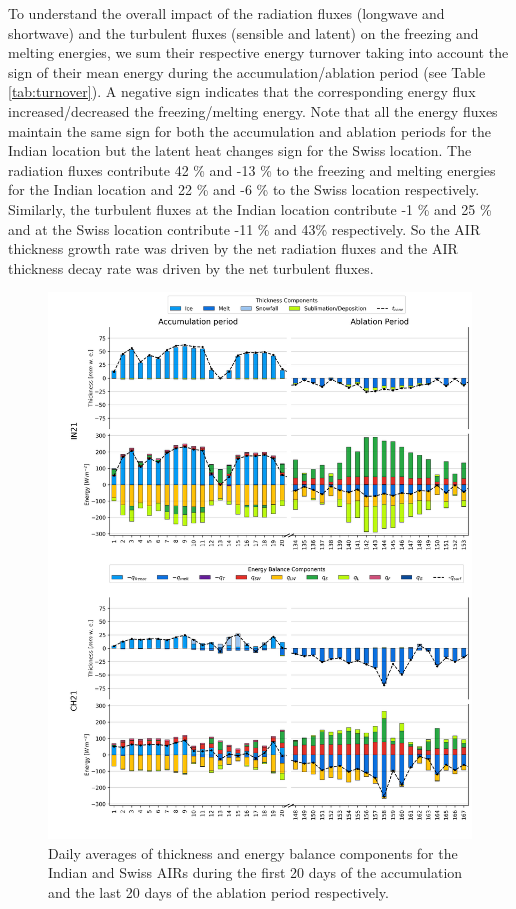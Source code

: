 \documentclass[utf8]{frontiersSCNS}
\begin{document}
To understand the overall impact of the radiation fluxes (longwave and shortwave) and the turbulent fluxes
(sensible and latent) on the freezing and melting energies, we sum their respective energy turnover taking into
account the sign of their mean energy during the accumulation/ablation period (see Table \ref{tab:turnover}). A negative sign indicates that
the corresponding energy flux increased/decreased the freezing/melting energy. Note that all the energy fluxes
maintain the same sign for both the accumulation and ablation periods for the Indian location but the latent
heat changes sign for the Swiss location. The radiation fluxes contribute 42 \% and -13 \% to the freezing and
melting energies for the Indian location and 22 \% and -6 \%  to the Swiss location respectively.  Similarly,
the turbulent fluxes at the Indian location contribute -1 \% and 25 \% and at the Swiss location contribute -11
\% and 43\%  respectively. So the AIR thickness growth rate was driven by the net radiation fluxes and the AIR
thickness decay rate was driven by the net turbulent fluxes.

\begin{figure}
	\begin{center}
		\includegraphics[width=\linewidth]{Figures/mass_energy_bal.jpg} \end{center}
	\caption{Daily averages of thickness and energy balance components for the Indian and Swiss AIRs during the
		first 20 days of the accumulation and the last 20 days of the ablation period respectively.  } \label{fig:MEB}
\end{figure}
\end{document}
